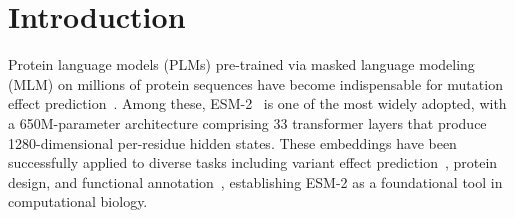 \documentclass[11pt,a4paper]{article}
\newcommand{\revised}[1]{\textcolor{red}{#1}}
\begin{document}
\begin{abstract}
\textbf{Availability and Implementation:} All code and processed results are available at
\url{https://github.com/schwarzeteeguo-creator/esm2-layer-invariance}. \revised{An archived
snapshot of the code and per-dataset results for this revision is deposited at Zenodo
(DOI: 10.5281/zenodo.22844290).} The benchmarking pipeline, including masked-position
feature extraction, multi-scale pooling, and logit lens analysis, is implemented in Python
using PyTorch and scikit-learn.
\end{abstract}

\section{Introduction}

Protein language models (PLMs) pre-trained via masked language modeling (MLM) on
millions of protein sequences have become indispensable for mutation effect
prediction~\cite{rives2021biological,meier2021language,lin2023evolutionary}.
Among these, ESM-2~\cite{lin2023evolutionary}
is one of the most widely adopted, with a 650M-parameter architecture comprising 33
transformer layers that produce 1280-dimensional per-residue hidden states. These
embeddings have been successfully applied to diverse tasks including variant effect
prediction~\cite{frazer2021disease,hie2021learning}, protein design, and functional
annotation~\cite{elnaggar2022prottrans,brandes2022proteinbert}, establishing ESM-2 as a
foundational tool in computational biology.
\end{document}
